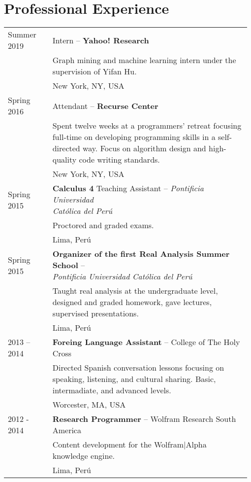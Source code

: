 \documentclass[12pt,]{scrartcl}
\begin{document}
\section{Professional Experience}\label{experience}
\begin{table}[h]
{\def\arraystretch{1.5}\tabcolsep=0pt
\begin{tabular}{p{0.18\linewidth}p{0.8\linewidth}}

Summer 2019 & Intern -- \textbf{Yahoo! Research} \\
& Graph mining and machine learning intern under the supervision of Yifan Hu. \\
& New York, NY, USA \\

Spring 2016 & Attendant -- \textbf{Recurse Center} \\
& Spent twelve weeks at a programmers' retreat focusing full-time on developing programming skills in a self-directed way. Focus on algorithm design and high-quality code writing standards. \\
& New York, NY, USA \\

Spring 2015 & \makecell[l]{\textbf{Calculus 4} Teaching Assistant -- \textit{Pontificia Universidad} \\ \textit{Católica del Perú}} \\
& Proctored and graded exams. \\
& Lima, Perú \\

Spring 2015 & \makecell[l]{\textbf{Organizer of the first Real Analysis Summer School} -- \\ \textit{Pontificia Universidad Católica del Perú}} \\
& Taught real analysis at the undergraduate level, designed and graded homework, gave lectures, supervised presentations. \\
& Lima, Perú \\

2013 -- 2014 & \textbf{Foreing Language Assistant} -- College of The Holy Cross \\ & Directed Spanish conversation lessons focusing on speaking, listening, and cultural sharing. Basic, intermadiate, and advanced levels. \\
& Worcester, MA, USA \\

2012 - 2014 & \textbf{Research Programmer} -- Wolfram Research South America \\
& Content development for the Wolfram|Alpha knowledge engine. \\
& Lima, Perú\\

\end{tabular}
}
\end{table}
\end{document}
